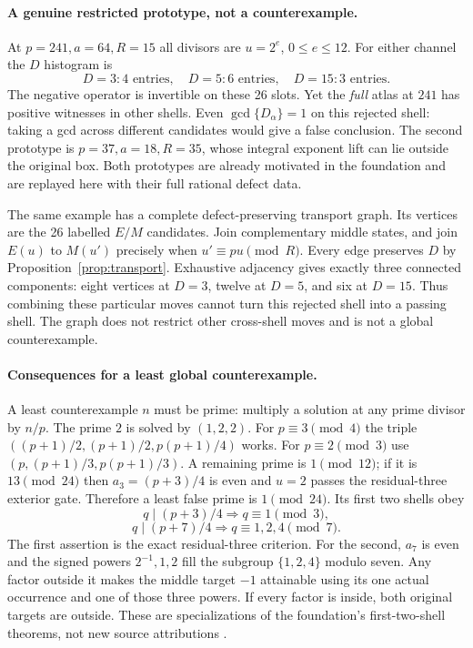 \documentclass[11pt]{article}
\theoremstyle{definition}\newtheorem{definition}[theorem]{Definition}
\theoremstyle{remark}\newtheorem{remark}[theorem]{Remark}
\begin{document}
\paragraph{A genuine restricted prototype, not a counterexample.}
At $p=241,a=64,R=15$ all divisors are $u=2^e$, $0\le e\le12$.
For either channel the $D$ histogram is
\[
 D=3:4\text{ entries},\quad D=5:6\text{ entries},\quad D=15:3\text{ entries}.
\]
The negative operator is invertible on these 26 slots. Yet the \emph{full}
atlas at $241$ has positive witnesses in other shells. Even
$\gcd\{D_\alpha\}=1$ on this rejected shell: taking a gcd across different
candidates would give a false conclusion. The second prototype is
$p=37,a=18,R=35$, whose integral exponent lift can lie outside the original
box. Both prototypes are already motivated in the foundation and are
replayed here with their full rational defect data.

The same example has a complete defect-preserving transport graph. Its
vertices are the 26 labelled $E/M$ candidates. Join complementary middle
states, and join $E(u)$ to $M(u')$ precisely when
$u'\equiv pu\pmod R$. Every edge preserves $D$ by
Proposition~\ref{prop:transport}. Exhaustive adjacency gives exactly
three connected components: eight vertices at $D=3$, twelve at $D=5$,
and six at $D=15$. Thus combining these particular moves cannot turn
this rejected shell into a passing shell. The graph does not restrict
other cross-shell moves and is not a global counterexample.

\paragraph{Consequences for a least global counterexample.}
A least counterexample $n$ must be prime: multiply a solution at any prime
divisor by $n/p$. The prime $2$ is solved by $(1,2,2)$. For $p\equiv3\pmod4$
the triple $((p+1)/2,(p+1)/2,p(p+1)/4)$ works. For $p\equiv2\pmod3$ use
$(p,(p+1)/3,p(p+1)/3)$. A remaining prime is $1\pmod{12}$; if it is
$13\pmod{24}$ then $a_3=(p+3)/4$ is even and $u=2$ passes the residual-three
exterior gate. Therefore a least false prime is $1\pmod{24}$.
Its first two shells obey
\[
 q\mid (p+3)/4\Longrightarrow q\equiv1\pmod3,
\]
\[
 q\mid (p+7)/4\Longrightarrow q\equiv1,2,4\pmod7.
\]
The first assertion is the exact residual-three criterion. For the second,
$a_7$ is even and the signed powers $2^{-1},1,2$ fill the subgroup
$\{1,2,4\}$ modulo seven. Any factor outside it makes the middle target
$-1$ attainable using its one actual occurrence and one of those three
powers. If every factor is inside, both original targets are outside.
These are specializations of the foundation's first-two-shell theorems,
not new source attributions \cite{foundation}.
\end{document}
